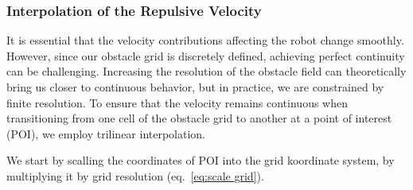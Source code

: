 \documentclass[]{article}
\begin{document}
\subsubsection{Interpolation of the Repulsive Velocity}

%
%
%
%

It is essential that the velocity contributions affecting the robot change smoothly. However, since our obstacle grid is discretely defined, achieving perfect continuity can be challenging. Increasing the resolution of the obstacle field can theoretically bring us closer to continuous behavior, but in practice, we are constrained by finite resolution. To ensure that the velocity remains continuous when transitioning from one cell of the obstacle grid to another at a point of interest (POI), we employ trilinear interpolation. 

We start by scalling the coordinates of POI into the grid koordinate system, by multiplying it by grid resolution (eq.~\ref{eq:scale grid}). 
\end{document}
